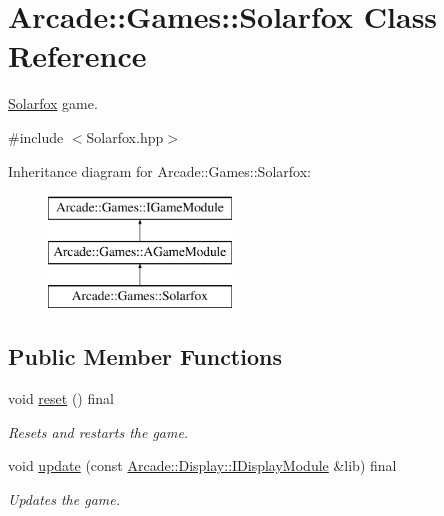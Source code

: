 \hypertarget{classArcade_1_1Games_1_1Solarfox}{}\section{Arcade\+::Games\+::Solarfox Class Reference}
\label{classArcade_1_1Games_1_1Solarfox}


\mbox{\hyperlink{classArcade_1_1Games_1_1Solarfox}{Solarfox}} game.  




{\ttfamily \#include $<$Solarfox.\+hpp$>$}

Inheritance diagram for Arcade\+::Games\+::Solarfox\+:\begin{figure}[H]
\begin{center}
\leavevmode
\includegraphics[height=3.000000cm]{classArcade_1_1Games_1_1Solarfox}
\end{center}
\end{figure}
\subsection*{Public Member Functions}
\begin{DoxyCompactItemize}
\item 
\mbox{\label{classArcade_1_1Games_1_1Solarfox_abd44684c20c1590db929f494a55d5576}} 
void \mbox{\hyperlink{classArcade_1_1Games_1_1Solarfox_abd44684c20c1590db929f494a55d5576}{reset}} () final
\begin{DoxyCompactList}\small\item\em Resets and restarts the game. \end{DoxyCompactList}\item 
void \mbox{\hyperlink{classArcade_1_1Games_1_1Solarfox_a87d7898dc7b5d8c658a18c45d35be991}{update}} (const \mbox{\hyperlink{classArcade_1_1Display_1_1IDisplayModule}{Arcade\+::\+Display\+::\+I\+Display\+Module}} \&lib) final
\begin{DoxyCompactList}\small\item\em Updates the game. \end{DoxyCompactList}\end{DoxyCompactItemize}

